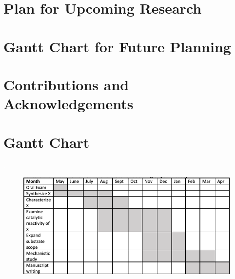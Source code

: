 \documentclass{report}
\begin{document}
\section{Plan for Upcoming Research}
\label{sec:plan_upcoming}


\section{Gantt Chart for Future Planning}
\label{sec:gantt_chart_text}


\section{Contributions and Acknowledgements}
\label{sec:contribution_acknowledgements}


\newpage
\section{Gantt Chart}
\label{sec:gantt}

\textcolor{white}{.}

\begin{figure}[H]
    \centering
    \includegraphics[width=\textwidth]{figures/gantt_chart.png}
    \label{fig:gantt_chart}
\end{figure}

\newpage
\printbibliography
\end{document}
